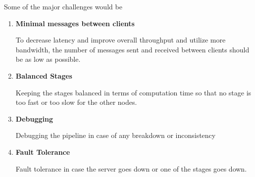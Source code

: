 \vspace*{5mm}

Some of the major challenges would be

\begin{enumerate}
	\item {
		\textbf{Minimal messages between clients}
		
		To decrease latency and improve overall throughput and utilize more bandwidth, the number of messages sent and received between clients should be as low as possible.
	}

	\item {
		\textbf{Balanced Stages}
		
		Keeping the stages balanced in terms of computation time so that no stage is too fast or too slow for the other nodes.
	}

	\item {
		\textbf{Debugging}
		
		Debugging the pipeline in case of any breakdown or inconsistency
	}

	\item {
		\textbf{Fault Tolerance}
		
		Fault tolerance in case the server goes down or one of the stages goes down.	
	}
	
\end{enumerate}